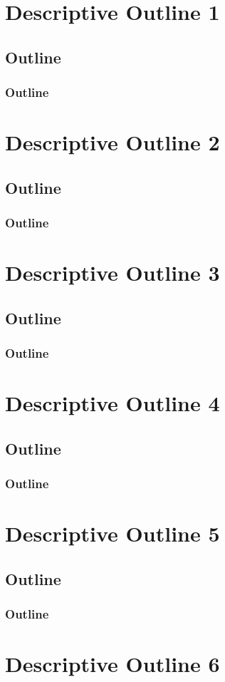 \documentclass[
    aspectratio=169
]{beamer}
\begin{document}
\section{Descriptive Outline 1}
\subsection{Outline}
\begin{frame}
\frametitle{Outline}
\end{frame}
\section{Descriptive Outline 2}
\subsection{Outline}
\begin{frame}
\frametitle{Outline}
\end{frame}
\section{Descriptive Outline 3}
\subsection{Outline}
\begin{frame}
\frametitle{Outline}
\end{frame}
\section{Descriptive Outline 4}
\subsection{Outline}
\begin{frame}
\frametitle{Outline}
\end{frame}
\section{Descriptive Outline 5 }
\subsection{Outline}
\begin{frame}
\frametitle{Outline}
\end{frame}
\section{Descriptive Outline 6}
\end{document}
